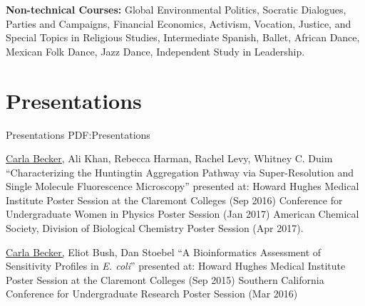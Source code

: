 \documentclass[letterpaper,10pt,oneside]{article}
\begin{document}
\begin{body}
{\textbf{Non-technical Courses:}}
Global Environmental Politics,
Socratic Dialogues,
Parties and Campaigns, 
Financial Economics,
Activism, Vocation, Justice, and Special Topics in Religious Studies,
Intermediate Spanish, 
Ballet, 
African Dance,
Mexican Folk Dance, 
Jazz Dance,
Independent Study in Leadership.


\section
{Presentations}
{Presentations}
{PDF:Presentations}

\SubBulletItem
\underline{Carla Becker,} Ali Khan, Rebecca Harman, Rachel Levy, Whitney C. Duim 
\SubBulletItem
“Characterizing the Huntingtin Aggregation Pathway via Super-Resolution and Single Molecule Fluorescence Microscopy” presented at:
\SubBulletItemBullet
Howard Hughes Medical Institute Poster Session at the Claremont Colleges (Sep 2016)
\SubBulletItemBullet Conference for Undergraduate Women in Physics Poster Session (Jan 2017)
\SubBulletItemBullet American Chemical Society, Division of Biological Chemistry Poster Session (Apr 2017).

\Gap
\SubBulletItem
\underline{Carla Becker,} Eliot Bush, Dan Stoebel
\SubBulletItem
“A Bioinformatics Assessment of Sensitivity Profiles in {\it E. coli}” presented at:
\SubBulletItemBullet Howard Hughes Medical Institute Poster Session at the Claremont Colleges (Sep 2015) 
\SubBulletItemBullet Southern California Conference for Undergraduate Research Poster Session (Mar 2016)

\end{body}
\thispagestyle{empty}



\end{document}
